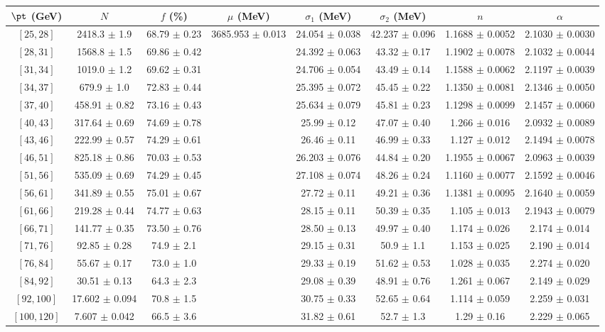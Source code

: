 \begin{tabular}{c||c|c|c|c|c|c|c}
$\pt$ (GeV) & $N$ & $f$ (\%) & $\mu$ (MeV) & $\sigma_1$ (MeV) & $\sigma_2$ (MeV) & $n$ & $\alpha$ \\
\hline
$[25, 28]$ & 2418.3 $\pm$ 1.9 & 68.79 $\pm$ 0.23 & \multirow{17}{*}{3685.953 $\pm$ 0.013} & 24.054 $\pm$ 0.038 & 42.237 $\pm$ 0.096 & 1.1688 $\pm$ 0.0052 & 2.1030 $\pm$ 0.0030\\
$[28, 31]$ & 1568.8 $\pm$ 1.5 & 69.86 $\pm$ 0.42 &  & 24.392 $\pm$ 0.063 & 43.32 $\pm$ 0.17 & 1.1902 $\pm$ 0.0078 & 2.1032 $\pm$ 0.0044\\
$[31, 34]$ & 1019.0 $\pm$ 1.2 & 69.62 $\pm$ 0.31 &  & 24.706 $\pm$ 0.054 & 43.49 $\pm$ 0.14 & 1.1588 $\pm$ 0.0062 & 2.1197 $\pm$ 0.0039\\
$[34, 37]$ & 679.9 $\pm$ 1.0 & 72.83 $\pm$ 0.44 &  & 25.395 $\pm$ 0.072 & 45.45 $\pm$ 0.22 & 1.1350 $\pm$ 0.0081 & 2.1346 $\pm$ 0.0050\\
$[37, 40]$ & 458.91 $\pm$ 0.82 & 73.16 $\pm$ 0.43 &  & 25.634 $\pm$ 0.079 & 45.81 $\pm$ 0.23 & 1.1298 $\pm$ 0.0099 & 2.1457 $\pm$ 0.0060\\
$[40, 43]$ & 317.64 $\pm$ 0.69 & 74.69 $\pm$ 0.78 &  & 25.99 $\pm$ 0.12 & 47.07 $\pm$ 0.40 & 1.266 $\pm$ 0.016 & 2.0932 $\pm$ 0.0089\\
$[43, 46]$ & 222.99 $\pm$ 0.57 & 74.29 $\pm$ 0.61 &  & 26.46 $\pm$ 0.11 & 46.99 $\pm$ 0.33 & 1.127 $\pm$ 0.012 & 2.1494 $\pm$ 0.0078\\
$[46, 51]$ & 825.18 $\pm$ 0.86 & 70.03 $\pm$ 0.53 &  & 26.203 $\pm$ 0.076 & 44.84 $\pm$ 0.20 & 1.1955 $\pm$ 0.0067 & 2.0963 $\pm$ 0.0039\\
$[51, 56]$ & 535.09 $\pm$ 0.69 & 74.29 $\pm$ 0.45 &  & 27.108 $\pm$ 0.074 & 48.26 $\pm$ 0.24 & 1.1160 $\pm$ 0.0077 & 2.1592 $\pm$ 0.0046\\
$[56, 61]$ & 341.89 $\pm$ 0.55 & 75.01 $\pm$ 0.67 &  & 27.72 $\pm$ 0.11 & 49.21 $\pm$ 0.36 & 1.1381 $\pm$ 0.0095 & 2.1640 $\pm$ 0.0059\\
$[61, 66]$ & 219.28 $\pm$ 0.44 & 74.77 $\pm$ 0.63 &  & 28.15 $\pm$ 0.11 & 50.39 $\pm$ 0.35 & 1.105 $\pm$ 0.013 & 2.1943 $\pm$ 0.0079\\
$[66, 71]$ & 141.77 $\pm$ 0.35 & 73.50 $\pm$ 0.76 &  & 28.50 $\pm$ 0.13 & 49.97 $\pm$ 0.40 & 1.174 $\pm$ 0.026 & 2.174 $\pm$ 0.014\\
$[71, 76]$ & 92.85 $\pm$ 0.28 & 74.9 $\pm$ 2.1 &  & 29.15 $\pm$ 0.31 & 50.9 $\pm$ 1.1 & 1.153 $\pm$ 0.025 & 2.190 $\pm$ 0.014\\
$[76, 84]$ & 55.67 $\pm$ 0.17 & 73.0 $\pm$ 1.0 &  & 29.33 $\pm$ 0.19 & 51.62 $\pm$ 0.53 & 1.028 $\pm$ 0.035 & 2.274 $\pm$ 0.020\\
$[84, 92]$ & 30.51 $\pm$ 0.13 & 64.3 $\pm$ 2.3 &  & 29.08 $\pm$ 0.39 & 48.91 $\pm$ 0.76 & 1.261 $\pm$ 0.067 & 2.149 $\pm$ 0.029\\
$[92, 100]$ & 17.602 $\pm$ 0.094 & 70.8 $\pm$ 1.5 &  & 30.75 $\pm$ 0.33 & 52.65 $\pm$ 0.64 & 1.114 $\pm$ 0.059 & 2.259 $\pm$ 0.031\\
$[100, 120]$ & 7.607 $\pm$ 0.042 & 66.5 $\pm$ 3.6 &  & 31.82 $\pm$ 0.61 & 52.7 $\pm$ 1.3 & 1.29 $\pm$ 0.16 & 2.229 $\pm$ 0.065\\
\end{tabular}
